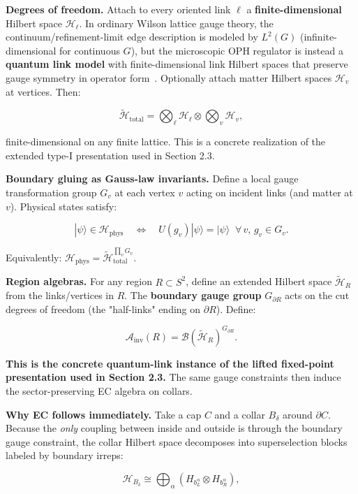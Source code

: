 \textbf{Degrees of freedom.} Attach to every oriented link \(\ell\) a \textbf{finite-dimensional} Hilbert space \(\mathcal{H}_\ell\). In ordinary Wilson lattice gauge theory, the continuum/refinement-limit edge description is modeled by \(L^2(G)\) (infinite-dimensional for continuous \(G\)), but the microscopic OPH regulator is instead a \textbf{quantum link model} with finite-dimensional link Hilbert spaces that preserve gauge symmetry in operator form~\cite{cw97}. Optionally attach matter Hilbert spaces \(\mathcal{H}_v\) at vertices. Then:

\[
\tilde{\mathcal{H}}_{\mathrm{total}} = \bigotimes_\ell \mathcal{H}_\ell \otimes \bigotimes_v \mathcal{H}_v,
\]

finite-dimensional on any finite lattice. This is a concrete realization of the extended type-I presentation used in Section 2.3.

\textbf{Boundary gluing as Gauss-law invariants.} Define a local gauge transformation group \(G_v\) at each vertex \(v\) acting on incident links (and matter at \(v\)). Physical states satisfy:

\[
|\psi\rangle \in \mathcal{H}_{\mathrm{phys}} \quad\Longleftrightarrow\quad U(g_v)|\psi\rangle = |\psi\rangle \;\;\forall\, v,\, g_v \in G_v.
\]

Equivalently: \(\mathcal{H}_{\mathrm{phys}} = \tilde{\mathcal{H}}_{\mathrm{total}}^{\prod_v G_v}\).

\textbf{Region algebras.} For any region \(R \subset S^2\), define an extended Hilbert space \(\tilde{\mathcal{H}}_R\) from the links/vertices in \(R\). The \textbf{boundary gauge group} \(G_{\partial R}\) acts on the cut degrees of freedom (the "half-links" ending on \(\partial R\)). Define:

\[
\mathcal{A}_{\mathrm{inv}}(R) = \mathcal{B}(\tilde{\mathcal{H}}_R)^{G_{\partial R}}.
\]

\textbf{This is the concrete quantum-link instance of the lifted fixed-point presentation used in Section 2.3.} The same gauge constraints then induce the sector-preserving EC algebra on collars.

\textbf{Why EC follows immediately.} Take a cap \(C\) and a collar \(B_\delta\) around \(\partial C\). Because the \emph{only} coupling between inside and outside is through the boundary gauge constraint, the collar Hilbert space decomposes into superselection blocks labeled by boundary irreps:

\[
\mathcal{H}_{B_\delta} \cong \bigoplus_\alpha (H_{b_L^\alpha} \otimes H_{b_R^\alpha}),
\]

